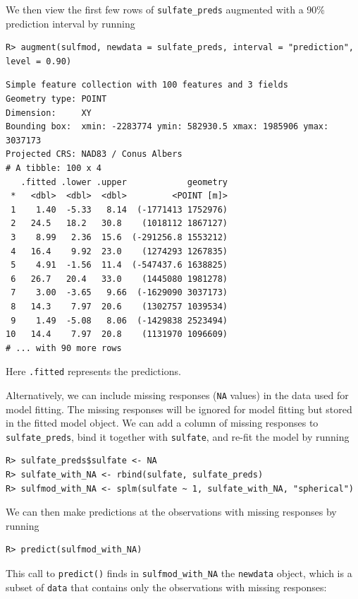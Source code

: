 \documentclass{article}
\begin{document}
We then view the first few rows of \texttt{sulfate\_preds} augmented
with a 90\% prediction interval by running

\begin{verbatim}
R> augment(sulfmod, newdata = sulfate_preds, interval = "prediction", level = 0.90)
\end{verbatim}

\begin{verbatim}
Simple feature collection with 100 features and 3 fields
Geometry type: POINT
Dimension:     XY
Bounding box:  xmin: -2283774 ymin: 582930.5 xmax: 1985906 ymax: 3037173
Projected CRS: NAD83 / Conus Albers
# A tibble: 100 x 4
   .fitted .lower .upper            geometry
 *   <dbl>  <dbl>  <dbl>         <POINT [m]>
 1    1.40  -5.33   8.14  (-1771413 1752976)
 2   24.5   18.2   30.8    (1018112 1867127)
 3    8.99   2.36  15.6  (-291256.8 1553212)
 4   16.4    9.92  23.0    (1274293 1267835)
 5    4.91  -1.56  11.4  (-547437.6 1638825)
 6   26.7   20.4   33.0    (1445080 1981278)
 7    3.00  -3.65   9.66  (-1629090 3037173)
 8   14.3    7.97  20.6    (1302757 1039534)
 9    1.49  -5.08   8.06  (-1429838 2523494)
10   14.4    7.97  20.8    (1131970 1096609)
# ... with 90 more rows
\end{verbatim}

Here \texttt{.fitted} represents the predictions.

Alternatively, we can include missing responses (\texttt{NA} values) in
the data used for model fitting. The missing responses will be ignored
for model fitting but stored in the fitted model object. We can add a
column of missing responses to \texttt{sulfate\_preds}, bind it together
with \texttt{sulfate}, and re-fit the model by running

\begin{verbatim}
R> sulfate_preds$sulfate <- NA
R> sulfate_with_NA <- rbind(sulfate, sulfate_preds)
R> sulfmod_with_NA <- splm(sulfate ~ 1, sulfate_with_NA, "spherical")
\end{verbatim}

We can then make predictions at the observations with missing responses
by running

\begin{verbatim}
R> predict(sulfmod_with_NA)
\end{verbatim}

This call to \texttt{predict()} finds in \texttt{sulfmod\_with\_NA} the
\texttt{newdata} object, which is a subset of \texttt{data} that
contains only the observations with missing responses:
\end{document}
